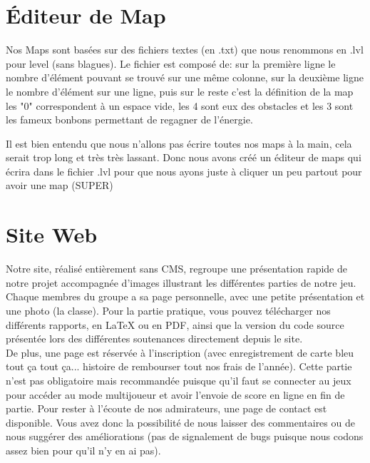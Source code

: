 \documentclass [11pt]{report}
\begin{document}
	\newpage
	\section{\'Editeur de Map}
	Nos Maps sont basées sur des fichiers textes (en .txt) que nous renommons en .lvl pour level (sans blagues). Le fichier est composé de: sur la première ligne le nombre d'élément pouvant se trouvé sur une même colonne, sur la deuxième ligne le nombre d'élément sur une ligne, puis sur le reste c'est la définition de la map %
	les "0" correspondent à un espace vide, les 4 sont eux des obstacles et les 3 sont les fameux bonbons permettant de regagner de l'énergie.
	
	\indent Il est bien entendu que nous n'allons pas écrire toutes nos maps à la main, cela serait trop long et très très lassant. Donc nous avons créé un éditeur de maps qui écrira dans le fichier .lvl pour que nous ayons juste à cliquer un peu partout pour avoir une map (SUPER) %
	 
	\section{Site Web}
	Notre site, réalisé entièrement sans CMS, regroupe une présentation rapide de notre projet accompagnée d'images illustrant les différentes parties de notre jeu. Chaque membres du groupe a sa page personnelle, avec une petite présentation et une photo (la classe). Pour la partie pratique, vous pouvez télécharger nos différents rapports, en LaTeX ou en PDF, ainsi que la version du code source présentée lors des différentes soutenances directement depuis le site. \\
	De plus, une page est réservée à l'inscription (avec enregistrement de carte bleu tout ça tout ça... histoire de rembourser tout nos frais de l'année). Cette partie n'est pas obligatoire mais recommandée puisque qu'il faut se connecter au jeux pour accéder au mode multijoueur et avoir l'envoie de score en ligne en fin de partie. Pour rester à l'écoute de nos admirateurs, une page de contact est disponible. Vous avez donc la possibilité de nous laisser des commentaires ou de nous suggérer des améliorations (pas de signalement de bugs puisque nous codons assez bien pour qu'il n'y en ai pas).
	
	
	
\end{document}
